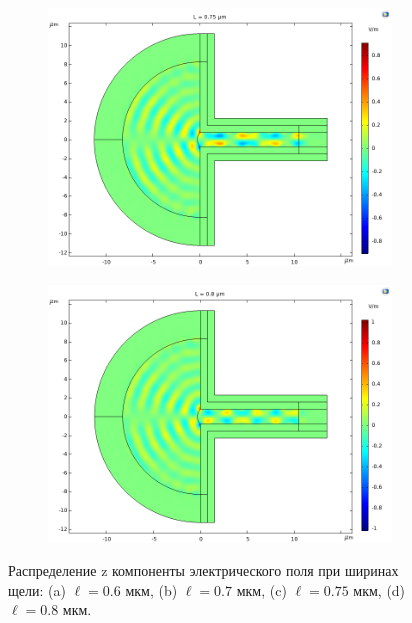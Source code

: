 \begin{figure}
    \begin{subfigure}[t]{0.4\textwidth}
        \centering
        \includegraphics[width=\textwidth]{figures/Ex_075.png}
        \caption{}
    \end{subfigure}
    \begin{subfigure}[t]{0.4\textwidth}
        \centering
        \includegraphics[width=\textwidth]{figures/Ex_08.png}
        \caption{}
        \label{fig:Ex_08}
    \end{subfigure}
    \caption{Распределение z компоненты электрического поля при ширинах щели: (a) $\ell = 0.6$ мкм, (b) $\ell = 0.7$ мкм, (c) $\ell = 0.75$ мкм, (d) $\ell = 0.8$ мкм.}
        \label{fig:Ex_06-08}
\end{figure}




